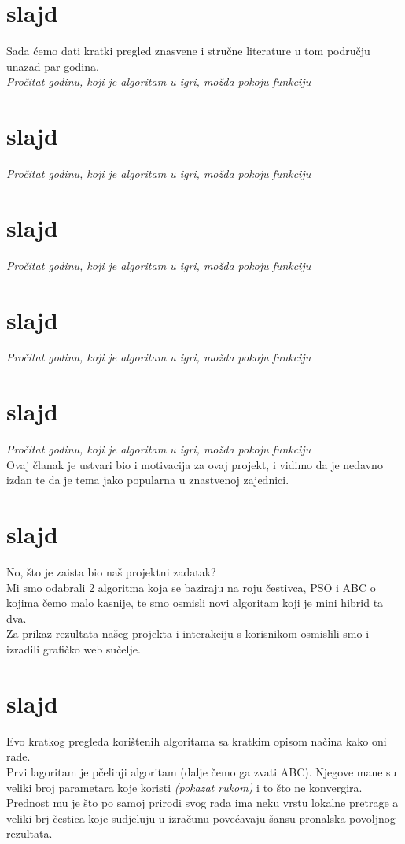 \documentclass[a4paper,10pt]{article}
\begin{document}
\section{slajd}
Sada \' cemo dati kratki pregled znasvene i stru\v cne literature u tom podru\v cju unazad par godina.\\
\emph{Pro\v citat godinu, koji je algoritam u igri, mo\v zda pokoju funkciju}

\section{slajd}
\emph{Pro\v citat godinu, koji je algoritam u igri, mo\v zda pokoju funkciju}

\section{slajd}
\emph{Pro\v citat godinu, koji je algoritam u igri, mo\v zda pokoju funkciju}
\section{slajd}

\emph{Pro\v citat godinu, koji je algoritam u igri, mo\v zda pokoju funkciju}
\section{slajd}

\emph{Pro\v citat godinu, koji je algoritam u igri, mo\v zda pokoju funkciju}\\
Ovaj \v clanak je ustvari bio i motivacija za ovaj projekt, i vidimo da je nedavno izdan te da je tema jako popularna u znastvenoj zajednici.

\section{slajd}
No, \v sto je zaista bio na\v s projektni zadatak?\\
Mi smo odabrali 2 algoritma koja se baziraju na roju \v cestivca, PSO i ABC o kojima \v cemo malo kasnije, te smo osmisli novi algoritam koji je mini hibrid ta dva.\\
Za prikaz rezultata na\v seg projekta i interakciju s korisnikom osmislili smo i izradili grafi\v cko web su\v celje.

\section{slajd}
Evo kratkog pregleda kori\v stenih algoritama sa kratkim opisom na\v cina kako oni rade.\\
Prvi lagoritam je p\v celinji algoritam (dalje \v cemo ga zvati ABC). Njegove mane su veliki broj parametara koje koristi \emph{(pokazat rukom)} i to \v sto ne konvergira. Prednost mu je \v sto po samoj prirodi svog rada ima neku vrstu lokalne pretrage a veliki brj \v cestica koje sudjeluju u izra\v cunu pove\' cavaju \v sansu pronalska povoljnog rezultata.
\end{document}
